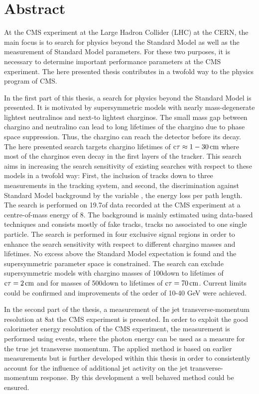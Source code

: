 \chapter*{Abstract}

At the CMS experiment at the Large Hadron Collider (LHC) at the CERN, the main focus is to search for physics beyond the Standard Model as well as the measurement of Standard Model parameters.
For these two purposes, it is necessary to determine important performance parameters at the CMS experiment.
The here presented thesis contributes in a twofold way to the physics program of CMS.

In the first part of this thesis, a search for physics beyond the Standard Model is presented.
It is motivated by supersymmetric models with nearly mass-degenerate lightest neutralinos and next-to lightest charginos.
The small mass gap between chargino and neutralino can lead to long lifetimes of the chargino due to phase space suppression.
Thus, the chargino can reach the detector before its decay.
The here presented search targets chargino lifetimes of $\text{c}\tau \approx 1 - 30\,\text{cm} $ where most of the charginos even decay in the first layers of the tracker. 
This search aims in increasing the search sensitivity of existing searches with respect to these models in a twofold way: First, the inclusion of tracks down to three measurements in the tracking system, and second, the discrimination against Standard Model background by the variable \dedx, the energy loss per path length.
The search is performed on 19.7\fbinv of data recorded at the CMS experiment at a centre-of-mass energy of 8\tev.
The background is mainly estimated using data-based techniques and consists mostly of fake tracks, \ie tracks no associated to one single particle.
The search is performed in four exclusive signal regions in order to enhance the search sensitivity with respect to different chargino masses and lifetimes.
No excess above the Standard Model expectation is found and the supersymmetric parameter space is constrained.
The search can exclude supersymmetric models with chargino masses of 100\gev down to lifetimes of $\text{c}\tau=2\,\text{cm}$ and for masses of 500\gev down to lifetimes of $\text{c}\tau=70\,\text{cm}$.
Current limits could be confirmed and improvements of the order of 10-40 GeV were achieved.

In the second part of the thesis, a measurement of the jet transverse-momentum resolution at 8\tev at the CMS experiment is presented.
In order to exploit the good calorimeter energy resolution of the CMS experiment, the measurement is performed using \GAMJET events, where the photon energy can be used as a measure for the true jet transverse momentum. 
The applied method is based on earlier measurements but is further developed within this thesis in order to consistently account for the influence of additional jet activity on the jet transverse-momentum response.
By this development a well behaved method could be ensured.

\cleardoublepage
